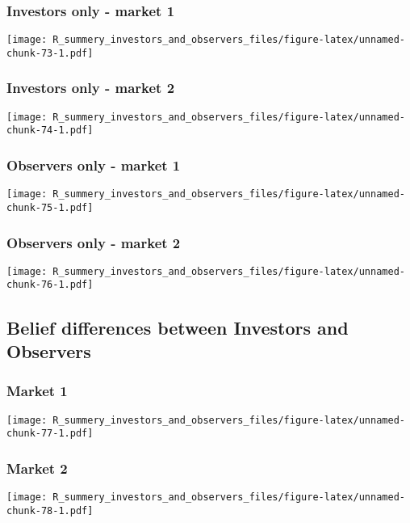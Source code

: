 \documentclass[]{article}
\begin{document}
\hypertarget{investors-only---market-1-5}{%
\subsubsection{Investors only - market
1}\label{investors-only---market-1-5}}

\texttt{[image: R\_summery\_investors\_and\_observers\_files/figure-latex/unnamed-chunk-73-1.pdf]}

\hypertarget{investors-only---market-2-5}{%
\subsubsection{Investors only - market
2}\label{investors-only---market-2-5}}

\texttt{[image: R\_summery\_investors\_and\_observers\_files/figure-latex/unnamed-chunk-74-1.pdf]}

\hypertarget{observers-only---market-1-5}{%
\subsubsection{Observers only - market
1}\label{observers-only---market-1-5}}

\texttt{[image: R\_summery\_investors\_and\_observers\_files/figure-latex/unnamed-chunk-75-1.pdf]}

\hypertarget{observers-only---market-2-5}{%
\subsubsection{Observers only - market
2}\label{observers-only---market-2-5}}

\texttt{[image: R\_summery\_investors\_and\_observers\_files/figure-latex/unnamed-chunk-76-1.pdf]}

\hypertarget{belief-differences-between-investors-and-observers-5}{%
\subsection{Belief differences between Investors and
Observers}\label{belief-differences-between-investors-and-observers-5}}

\hypertarget{market-1-5}{%
\subsubsection{Market 1}\label{market-1-5}}

\texttt{[image: R\_summery\_investors\_and\_observers\_files/figure-latex/unnamed-chunk-77-1.pdf]}

\hypertarget{market-2-5}{%
\subsubsection{Market 2}\label{market-2-5}}

\texttt{[image: R\_summery\_investors\_and\_observers\_files/figure-latex/unnamed-chunk-78-1.pdf]}
\end{document}
